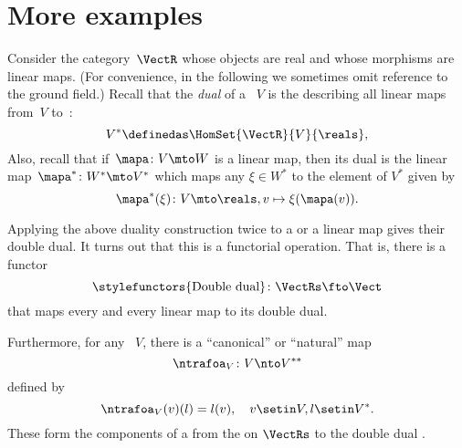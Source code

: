 \section{More examples}



\begin{example}
    \label{ex:Vect}
    Consider the category~$\VectR$ whose objects are real  and whose morphisms are linear maps.
    (For convenience, in the following we sometimes omit reference to the ground field.)
    Recall that the \emph{dual} of a ~$V$ is the  describing all linear maps from~$V$ to~\reals:
    \begin{equation}
        \label{eq:dual-vector-space}
        V^* \definedas \HomSet{\VectR}{V}{\reals},
    \end{equation}
    Also, recall that if~$\mapa\colon V \mto W$ is a linear map, then its dual is the linear map~$\mapa^* \linebreak[1] \colon W^* \mto V^*$ which maps any $\xi \in W^*$ to the element of $V^*$ given by
    \begin{equation}
        \mapa^*(\xi) \colon V \mto \reals, v \mapsto \xi(\mapa(v)).
    \end{equation}

    Applying the above duality construction twice to a  or a linear map gives their double dual.
    It turns out that this is a functorial operation.
    That is, there is a functor
    \begin{equation}
        \label{eq:double-dual-functor}
        \text{\stylefunctors{Double dual}}\colon \VectRs \fto \Vect
    \end{equation}
    that maps every  and every linear map to its double dual.

    Furthermore, for any ~$V$, there is a ``canonical'' or ``natural'' map
    \begin{equation}
        \ntrafoa_V \colon V \nto V^{**}
    \end{equation}
    defined by
    \begin{equation}
        \label{eq:natural-trafo-to-double-dual}
        \ntrafoa_V(v)(l) = l(v), \quad v \setin V, l \setin V^*.
    \end{equation}
    These form the components of a  from the  on $\VectRs$ to the double dual .
\end{example}

